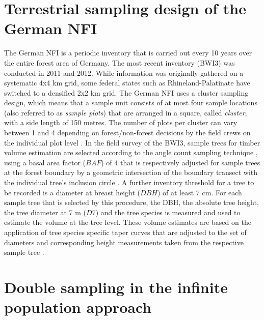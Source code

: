 

\section{Terrestrial sampling design of the German NFI}
\label{sec:germanNFI}

The German NFI is a periodic inventory that is carried out every 10 years over the entire forest area of Germany. The most recent inventory (BWI3) was conducted in 2011 and 2012. While information was originally gathered on a systematic 4x4 km grid, some federal states such as Rhineland-Palatinate have switched to a densified 2x2 km grid. The German NFI uses a cluster sampling design, which means that a sample unit consists of at most four sample locations (also referred to as \textit{sample plots}) that are arranged in a square, called \textit{cluster}, with a side length of 150 metres. The number of plots per cluster can vary between 1 and 4 depending on forest/non-forest decisions by the field crews on the individual plot level \citep{bwi3_aufn}. In the field survey of the BWI3, sample trees for timber volume estimation are selected according to the angle count sampling technique \citep{bitterlich1984}, using a basal area factor ($BAF$) of 4 that is respectively adjusted for sample trees at the forest boundary by a geometric intersection of the boundary transect with the individual tree's inclusion circle \citep{bwi3_aufn}. A further inventory threshold for a tree to be recorded is a diameter at breast height ($DBH$) of at least 7 cm. For each sample tree that is selected by this procedure, the DBH, the absolute tree height, the tree diameter at 7 m ($D7$) and the tree species is measured and used to estimate the volume at the tree level. These volume estimates are based on the application of tree species specific taper curves that are adjusted to the set of diameters and corresponding height measurements taken from the respective sample tree \citep{kublin2013}.

\section{Double sampling in the infinite population approach}
\label{sec:inf_pop}


